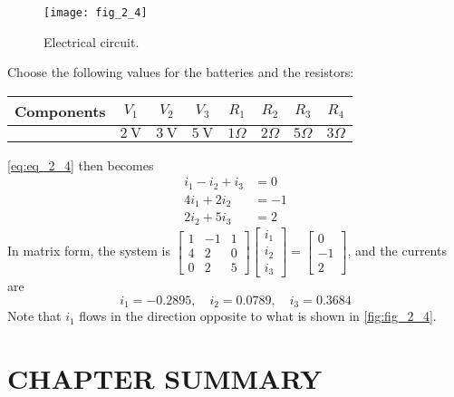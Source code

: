 \documentclass[../main.tex]{subfiles}
\begin{document}
\begin{figure}
	\centering
	\texttt{[image: fig\_2\_4]}
	\caption{Electrical circuit.}
	\label{fig:fig_2_4}
\end{figure}




Choose the following values for the batteries and the resistors:

\begin{tabular}{|l|c|c|c|c|c|c|c|}
	\hline Components & $V_{1}$ & $V_{2}$ & $V_{3}$ & $R_{1}$ & $R_{2}$ & $R_{3}$ & $R_{4}$ \\
	\hline & $2 \mathrm{~V}$ & $3 \mathrm{~V}$ & $5 \mathrm{~V}$ & $1 \Omega$ & $2 \Omega$ & $5 \Omega$ & $3 \Omega$ \\
	\hline
\end{tabular}

\autoref{eq:eq_2_4} then becomes
$$
\begin{aligned}
i_{1}-i_{2}+i_{3} &=0 \\
4 i_{1}+2 i_{2} &=-1 \\
2 i_{2}+5 i_{3} &=2
\end{aligned}
$$
In matrix form, the system is $\left[\begin{array}{ccc}1 & -1 & 1 \\ 4 & 2 & 0 \\ 0 & 2 & 5\end{array}\right]\left[\begin{array}{l}i_{1} \\ i_{2} \\ i_{3}\end{array}\right]=\left[\begin{array}{c}0 \\ -1 \\ 2\end{array}\right]$, and the currents are
$$
i_{1}=-0.2895, \quad i_{2}=0.0789, \quad i_{3}=0.3684
$$
Note that $i_{1}$ flows in the direction opposite to what is shown in \autoref{fig:fig_2_4}.

\section[Chapter Summary]{CHAPTER SUMMARY}
\end{document}
